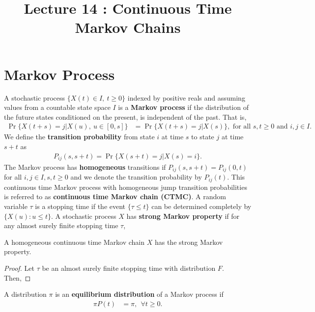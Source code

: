 \documentclass[a4paper,10pt,english]{article}
\title{Lecture 14 : Continuous Time Markov Chains}
\author{}
\begin{document}
\maketitle

\section{Markov Process}
A stochastic process $\{X(t) \in I, ~ t \geqslant 0\}$ indexed by positive reals and assuming values from a countable state space $I$ is a \textbf{Markov process} if 
the distribution of the future states conditioned on the present, is independent of the past. 
That is,
\begin{align*}
\Pr\{X(t+s) = j |X(u),~ u \in [0,s]\} &= \Pr\{X(t+s) = j |X(s)\}, \text{ for all } s, t \geqslant 0 \text{ and } i, j \in I.
\end{align*}
We define the \textbf{transition probability} from state $i$ at time $s$ to state $j$ at time $s+t$ as 
\begin{align*}
P_{ij}(s, s+t) = \Pr\{X(s+t) = j | X(s) = i\}.
\end{align*}
The Markov process has \textbf{homogeneous} transitions if $P_{ij}(s,s+t) = P_{ij}(0,t)$ for all $i,j \in I, s,t \geqslant 0$ and we denote the transition probability by $P_{ij}(t)$. 
This continuous time Markov process with homogeneous jump transition probabilities is referred to as \textbf{continuous time Markov chain (CTMC)}. 
A random variable $\tau$ is a stopping time if the event $\{\tau \leq t\}$ can be determined completely by $\{X(u): u \leqslant t\}$. 
A stochastic process $X$ has \textbf{strong Markov property} if for any almost surely finite stopping time $\tau$, 
\begin{lem}
\label{Lemma:StrongMarkovProperty}
A homogeneous continuous time Markov chain $X$ has the strong Markov property. 
\end{lem}
\begin{proof}
Let $\tau$ be an almost surely finite stopping time with distribution $F$. 
Then, 
\end{proof}
A distribution $\pi$ is an \textbf{equilibrium distribution} of a Markov process if
\begin{align*}
\pi P(t) &= \pi,~~ \forall t \geqslant 0. 
\end{align*}
\end{document}
